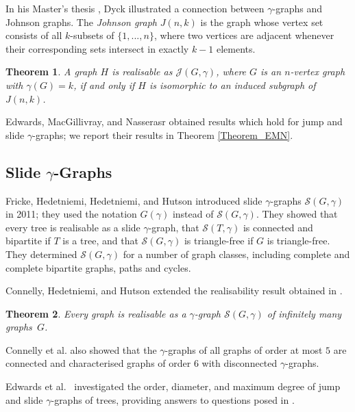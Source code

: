 \documentclass[12pt]{article}%
\newtheorem{theorem}{Theorem}[section]
\begin{document}
In his Master's thesis \cite{26CM-Dyck}, Dyck illustrated a connection between
$\gamma$-graphs and Johnson graphs. The \emph{Johnson graph} $J(n,k)$ is the
graph whose vertex set consists of all $k$-subsets of $\{1,...,n\}$, where two
vertices are adjacent whenever their corresponding sets intersect in exactly
$k-1$ elements.

\begin{theorem}
\emph{\cite{26CM-Dyck}}\hspace{0.1in}A graph $H$ is realisable as
$\mathcal{J}(G,\gamma)$, where $G$ is an $n$-vertex graph with $\gamma(G)=k$,
if and only if $H$ is isomorphic to an induced subgraph of $J(n,k)$.
\end{theorem}

Edwards, MacGillivray, and Nasserasr \cite{26CM-EMN} obtained results which
hold for jump and slide $\gamma$-graphs; we report their results in Theorem
\ref{Theorem_EMN}.

\subsection{Slide $\gamma$-Graphs}

\label{SecSlide}

Fricke, Hedetniemi, Hedetniemi, and Hutson \cite{26CM-FHHH} introduced slide
$\gamma$-graphs $\mathcal{S}(G,\gamma)$ in 2011; they used the notation
$G(\gamma)$ instead of $\mathcal{S}(G,\gamma)$. They showed that every tree is
realisable as a slide $\gamma$-graph, that $\mathcal{S}(T,\gamma)$ is
connected and bipartite if $T$ is a tree, and that $\mathcal{S}(G,\gamma)$ is
triangle-free if $G$ is triangle-free. They determined $\mathcal{S}(G,\gamma)$
for a number of graph classes, including complete and complete bipartite
graphs, paths and cycles.

Connelly, Hedetniemi, and Hutson \cite{26CM-ConHH} extended the realisability
result obtained in \cite{26CM-FHHH}.

\begin{theorem}
\emph{\cite{26CM-ConHH}}\hspace{0.1in}Every graph is realisable as a $\gamma
$-graph $\mathcal{S}(G,\gamma)$ of infinitely many graphs~$G$.
\end{theorem}

Connelly et al. \cite{26CM-ConHH} also showed that the $\gamma$-graphs of all
graphs of order at most $5$ are connected and characterised graphs of order
$6$ with disconnected $\gamma$-graphs.

Edwards et al.~\cite{26CM-EMN} investigated the order, diameter, and maximum
degree of jump and slide $\gamma$-graphs of trees, providing answers to
questions posed in \cite{26CM-FHHH}.
\end{document}
